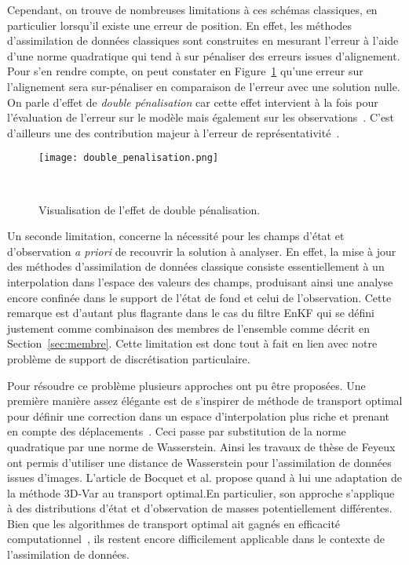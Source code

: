 Cependant, on trouve de nombreuses limitations à ces schémas classiques, en particulier lorsqu'il existe une erreur de position. En effet, les méthodes d'assimilation de données classiques sont construites en mesurant l'erreur à l'aide d'une norme quadratique qui tend à sur pénaliser des erreurs issues d'alignement. Pour s'en rendre compte, on peut constater en Figure~\ref{fig:double_penalization_error} qu'une erreur sur l'alignement sera sur-pénaliser en comparaison de l'erreur avec une solution nulle. On parle d'effet de \textit{double pénalisation} car cette effet intervient à la fois pour l'évaluation de l'erreur sur le modèle mais également sur les observations~\cite{amodei2009}. C'est d’ailleurs une des contribution majeur à l'erreur de représentativité~\cite{janjic2018}.

\begin{figure}[h]
    \centering
    \texttt{[image: double\_penalisation.png]}
    \caption{Visualisation de l'effet de double pénalisation.}~\label{fig:double_penalization_error}
\end{figure}

Un seconde limitation, concerne la nécessité pour les champs d'état et d'observation \textit{a priori} de recouvrir la solution à analyser. En effet, la mise à jour des méthodes d'assimilation de données classique consiste essentiellement à un interpolation dans l'espace des valeurs des champs, produisant ainsi une analyse encore confinée dans le support de l'état de fond et celui de l'observation. Cette remarque est d'autant plus flagrante dans le cas du filtre EnKF qui se défini justement comme combinaison des membres de l'ensemble comme décrit en Section~\ref{sec:membre}. Cette limitation est donc tout à fait en lien avec notre problème de support de discrétisation particulaire.


Pour résoudre ce problème plusieurs approches ont pu être proposées. Une première manière assez élégante est de s'inspirer de méthode de transport optimal pour définir une correction dans un espace d'interpolation plus riche et prenant en compte des déplacements~\cite{villani2009optimal,benamou_computational_2000}. Ceci passe par substitution de la norme quadratique par une norme de Wasserstein. Ainsi les travaux de thèse de Feyeux~\cite{feyeux_transport_2016} ont permis d'utiliser une distance de Wasserstein pour l'assimilation de données issues d'images. L'article de Bocquet et al. \cite{bocquet_bridging_2023} propose quand à lui une adaptation de la méthode 3D-Var au transport optimal.En particulier, son approche s'applique à des distributions d'état et d'observation de masses potentiellement différentes. Bien que les algorithmes de transport optimal ait gagnés en efficacité computationnel~\cite{cuturi_2014,peyre_cuturi_2019,Simsekli2018SlicedWassersteinFN}, ils restent encore difficilement applicable dans le contexte de l'assimilation de données.


